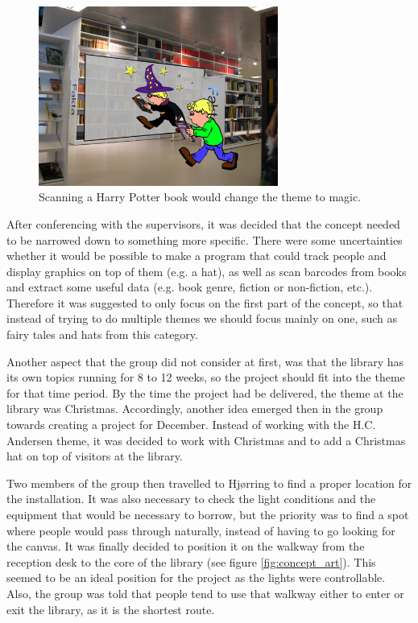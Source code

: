 \begin{figure}[htbp]
\centering
\includegraphics[width=0.7\textwidth]{Pictures/HjoerringLibrary/magician.png}
\caption{Scanning a Harry Potter book would change the theme to magic.}
\label{fig:bookTheme}
\end{figure}

After conferencing with the supervisors, it was decided that the concept needed to be narrowed down to something more specific. There were some uncertainties whether it would be possible to make a program that could track people and display graphics on top of them (e.g. a hat), as well as scan barcodes from books and extract some useful data (e.g. book genre, fiction or non-fiction, etc.). Therefore it was suggested to only focus on the first part of the concept, so that instead of trying to do multiple themes we should focus mainly on one, such as fairy tales and hats from this category.

Another aspect that the group did not consider at first, was that the library has its own topics running for 8 to 12 weeks, so the project should fit into the theme for that time period. By the time the project had be delivered, the theme at the library was Christmas. Accordingly, another idea emerged then in the group towards creating a project for December. Instead of working with the H.C. Andersen theme, it was decided to work with Christmas and to add a Christmas hat on top of visitors at the library.

Two members of the group then travelled to Hj{\o}rring to find a proper location for the installation. It was also necessary to check the light conditions and the equipment that would be necessary to borrow, but the priority was to find a spot where people would pass through naturally, instead of having to go looking for the canvas. It was finally decided to position it on the walkway from the reception desk to the core of the library (see figure \ref{fig:concept_art}). This seemed to be an ideal position for the project as the lights were controllable. Also, the group was told that people tend to use that walkway either to enter or exit the library, as it is the shortest route. 


